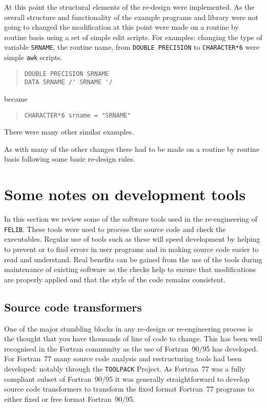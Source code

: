 \documentclass[a4paper,titlepage,11pt]{article}
\begin{document}
At this point the structural elements of the re-design were implemented. As the overall
structure and functionality of the example programs and library were not going to changed
the modification at this point were made on a routine by routine basis using a set of
simple edit scripts. For examples: changing the type of variable {\tt SRNAME}, the routine
name, from {\tt DOUBLE PRECISION} to {\tt CHARACTER*6} were simple {\tt awk} scripts.
\begin{quote}
\begin{verbatim}
DOUBLE PRECISION SRNAME
DATA SRNAME /' SRNAME '/
\end{verbatim}
\end{quote}
became
\begin{quote}
\begin{verbatim}
CHARACTER*6 srname = "SRNAME"
\end{verbatim}
\end{quote}
There were many other similar examples.

As with many of the other changes these had to be made on a routine by routine
basis following some basic re-design rules.

\section{Some notes on development tools}
In this section we review some of the software tools used in the re-engineering of {\tt FELIB}. 
These tools were used to process the source code and check the executables.
Regular use of tools such as these will speed development by helping to prevent or to find errors 
in user programs and in making source code easier to read and understand. 
Real benefits can be gained from the use of the tools during maintenance of existing software as the checks help to ensure that modifications are properly applied and that the style of the code remains consistent.

\subsection{Source code transformers}
One of the major stumbling blocks in any re-design or re-engineering process is the
thought that you have thousands of line of code to change. This has been well
recognised in the Fortran community as the use of Fortran~90/95 has developed. For
Fortran~77 many source code analysis and restructuring tools had been
developed: notably through the {\tt TOOLPACK} Project. As Fortran~77 was a fully compliant 
subset of Fortran~90/95 it was generally straightforward to develop source code transformers 
to transform the fixed format Fortran~77 programs to either fixed or free format Fortran~90/95.
\end{document}
